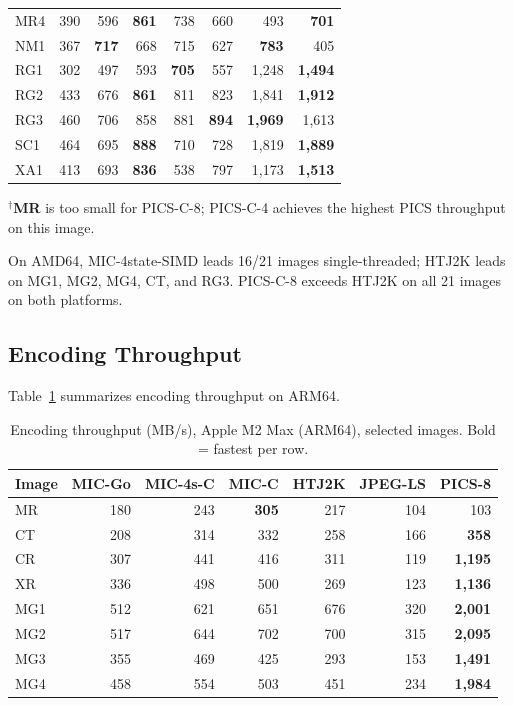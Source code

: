 \documentclass[journal]{IEEEtran}
\begin{document}
\begin{table}[t]
\begin{tabular}{lrrrrrrr}
MR4  & 390 & 596 & \textbf{861} & 738 & 660 & 493 & \textbf{701} \\
NM1  & 367 & \textbf{717} & 668 & 715 & 627 & \textbf{783} & 405 \\
RG1  & 302 & 497 & 593 & \textbf{705} & 557 & 1,248 & \textbf{1,494} \\
RG2  & 433 & 676 & \textbf{861} & 811 & 823 & 1,841 & \textbf{1,912} \\
RG3  & 460 & 706 & 858 & 881 & \textbf{894} & \textbf{1,969} & 1,613 \\
SC1  & 464 & 695 & \textbf{888} & 710 & 728 & 1,819 & \textbf{1,889} \\
XA1  & 413 & 693 & \textbf{836} & 538 & 797 & 1,173 & \textbf{1,513} \\
\bottomrule
\end{tabular}
\end{table}

$^\dagger$\textbf{MR} is too small for PICS-C-8; PICS-C-4 achieves the highest
PICS throughput on this image.

On AMD64, MIC-4state-SIMD leads 16/21 images single-threaded; HTJ2K leads on
MG1, MG2, MG4, CT, and RG3. PICS-C-8 exceeds HTJ2K on all 21 images on both
platforms.

\subsection{Encoding Throughput}

Table~\ref{tab:encoding} summarizes encoding throughput on ARM64.

\begin{table}[htbp]
\centering
\caption{Encoding throughput (MB/s), Apple M2 Max (ARM64), selected images.
Bold = fastest per row.}
\label{tab:encoding}
\scriptsize
\begin{tabular}{lrrrrrr}
\toprule
Image & MIC-Go & MIC-4s-C & MIC-C & HTJ2K & JPEG-LS & PICS-8 \\
\midrule
MR  & 180 & 243 & \textbf{305} & 217 & 104 & 103 \\
CT  & 208 & 314 & 332 & 258 & 166 & \textbf{358} \\
CR  & 307 & 441 & 416 & 311 & 119 & \textbf{1,195} \\
XR  & 336 & 498 & 500 & 269 & 123 & \textbf{1,136} \\
MG1 & 512 & 621 & 651 & 676 & 320 & \textbf{2,001} \\
MG2 & 517 & 644 & 702 & 700 & 315 & \textbf{2,095} \\
MG3 & 355 & 469 & 425 & 293 & 153 & \textbf{1,491} \\
MG4 & 458 & 554 & 503 & 451 & 234 & \textbf{1,984} \\
\bottomrule
\end{tabular}
\end{table}
\end{document}
